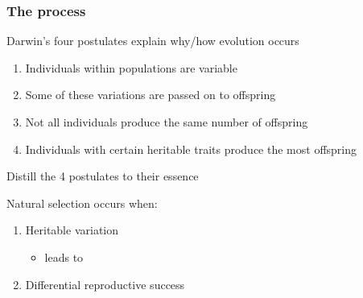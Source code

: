 \begin{frame}
    \frametitle{The process}

    Darwin’s four postulates explain why/how evolution occurs

    \begin{enumerate}
        \item<2-> Individuals within populations are variable
            \vspace{1cm}

        \item<2-> Some of these variations are passed on to offspring
            \vspace{1cm}

        \item<2-> Not all individuals produce the same number of offspring
            \vspace{1cm}

        \item<2-> Individuals with certain heritable traits produce the most
            offspring
            \vspace{1cm}
    \end{enumerate}

\end{frame}

\begin{frame}
    Distill the 4 postulates to their essence
    \vspace{0.5cm}

    Natural selection occurs when:
    \vspace{0.5cm}

    \begin{enumerate}
        \item<2-> Heritable variation
        \vspace{0.5cm}

        \begin{itemize}
            \item<3-> leads to
        \end{itemize}

        \vspace{0.5cm}
        \item<4-> Differential reproductive success 
    \end{enumerate}

    \vspace{0.5cm}

\end{frame}

